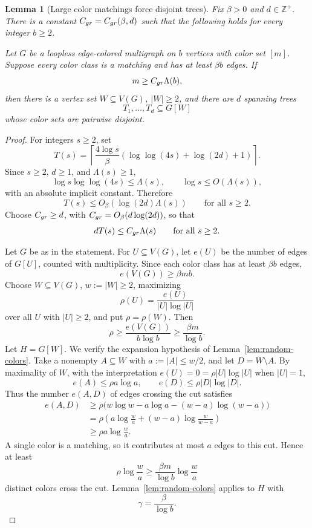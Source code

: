 \documentclass[10pt,a4paper]{amsart}
\newtheorem{lemma}[theorem]{Lemma}
\newcommand{\Zpos}{\mathbb{Z}^{+}}
\begin{document}
\begin{lemma}[Large color matchings force disjoint trees]\label{lem:many-matchings}
Fix \(\beta>0\) and \(d\in\Zpos\). There is a constant \(C_{\rm gr}=C_{\rm gr}(\beta,d)\) such that the following holds for every integer \(b\ge2\).

Let \(G\) be a loopless edge-colored multigraph on \(b\) vertices with color set \([m]\). Suppose every color class is a matching and has at least \(\beta b\) edges. If
\[
m\ge C_{\rm gr}\Lambda(b),
\]
then there is a vertex set \(W\subseteq V(G)\), \(|W|\ge2\), and there are \(d\) spanning trees
\[
T_1,\ldots,T_d\subseteq G[W]
\]
whose color sets are pairwise disjoint.
\end{lemma}

\begin{proof}
For integers \(s\ge2\), set
\[
T(s)=
\left\lceil
\frac{4\log s}{\beta}
\left(\log\log(4s)+\log(2d)+1\right)
\right\rceil.
\]
Since \(s\ge2\), \(d\ge1\), and \(\Lambda(s)\ge1\),
\[
\log s\log\log(4s)\le \Lambda(s),
\qquad
\log s\le O(\Lambda(s)),
\]
with an absolute implicit constant. Therefore
\[
T(s)\le O_\beta(\log(2d)\Lambda(s))
\qquad\text{for all }s\ge2.
\]
Choose \(C_{\rm gr}\ge d\), with \(C_{\rm gr}=O_\beta(d\log(2d))\), so that
\[
dT(s)\le C_{\rm gr}\Lambda(s)
\qquad\text{for all }s\ge2.
\]

Let \(G\) be as in the statement. For \(U\subseteq V(G)\), let \(e(U)\) be the number of edges of \(G[U]\), counted with multiplicity. Since each color class has at least \(\beta b\) edges,
\[
e(V(G))\ge \beta mb.
\]
Choose \(W\subseteq V(G)\), \(w:=|W|\ge2\), maximizing
\[
\rho(U)=\frac{e(U)}{|U|\log |U|}
\]
over all \(U\) with \(|U|\ge2\), and put \(\rho=\rho(W)\). Then
\[
\rho\ge \frac{e(V(G))}{b\log b}\ge \frac{\beta m}{\log b}.
\]
Let \(H=G[W]\). We verify the expansion hypothesis of Lemma~\ref{lem:random-colors}. Take a nonempty \(A\subseteq W\) with \(a:=|A|\le w/2\), and let \(D=W\setminus A\). By maximality of \(W\), with the interpretation \(e(U)=0=\rho |U|\log |U|\) when \(|U|=1\),
\[
e(A)\le \rho a\log a,
\qquad
e(D)\le \rho |D|\log |D|.
\]
Thus the number \(e(A,D)\) of edges crossing the cut satisfies
\[
\begin{aligned}
e(A,D)
&\ge \rho\bigl(w\log w-a\log a-(w-a)\log(w-a)\bigr)\\
&=\rho\left(a\log\frac wa+(w-a)\log\frac{w}{w-a}\right)\\
&\ge \rho a\log\frac wa.
\end{aligned}
\]
A single color is a matching, so it contributes at most \(a\) edges to this cut. Hence at least
\[
\rho\log\frac wa
\ge \frac{\beta m}{\log b}\log\frac wa
\]
distinct colors cross the cut. Lemma~\ref{lem:random-colors} applies to \(H\) with
\[
\gamma=\frac{\beta}{\log b}.
\]


\end{proof}
\end{document}
